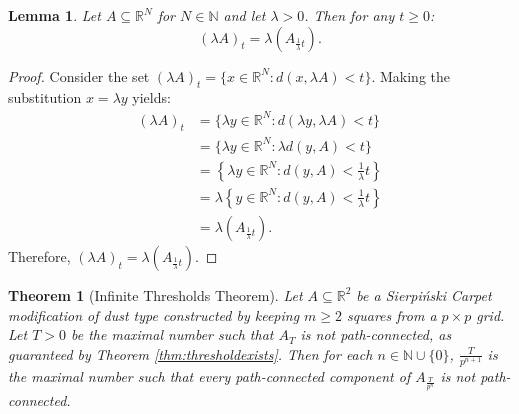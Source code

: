 \documentclass{article}
\theoremstyle{plain}
\newtheorem{theorem}{Theorem}
\newtheorem{lemma}{Lemma}
\numberwithin{equation}{section}
\numberwithin{table}{section}
\numberwithin{figure}{section}
\newcommand{\vaddspace}[1]{\rule{0pt}{#1pt}}
\newcommand{\newparagraph}{\vaddspace{10}}
\begin{document}
\begin{lemma} \label{thm:inflationlemma}
Let $A \subseteq \mathbb{R}^N$ for $N \in \mathbb{N}$ and let $\lambda > 0$. Then for any $t \geq 0$:
\begin{equation}
(\lambda A)_t = \lambda \left(A_{\frac{1}{\lambda} t}\right).
\end{equation}
\end{lemma}
\begin{proof}
Consider the set $(\lambda A)_t = \{x \in \mathbb{R}^N : d(x,\lambda A) < t\}$. Making the substitution $x = \lambda y$ yields:
\begin{align*}
(\lambda A)_t &= \{\lambda y \in \mathbb{R}^N : d(\lambda y, \lambda A) < t\}\\
&= \{\lambda y \in \mathbb{R}^N : \lambda d(y, A) < t\}\\
&= \left\{\lambda y \in \mathbb{R}^N : d(y, A) < \frac{1}{\lambda} t\right\}\\
&= \lambda \left\{y \in \mathbb{R}^N : d(y, A) < \frac{1}{\lambda} t\right\}\\
&= \lambda \left(A_{\frac{1}{\lambda} t}\right).
\end{align*}
Therefore, $\displaystyle (\lambda A)_t = \lambda \left(A_{\frac{1}{\lambda} t}\right)$.
\end{proof}
\newparagraph



\begin{theorem}[Infinite Thresholds Theorem] \label{thm:infinitethresholdsexist}
Let $A \subseteq \mathbb{R}^2$ be a Sierpi\'nski Carpet modification of dust type constructed by keeping $m \geq 2$ squares from a $p \times p$ grid. Let $T > 0$ be the maximal number such that $A_T$ is not path-connected, as guaranteed by Theorem \ref{thm:thresholdexists}. Then for each $n \in \mathbb{N} \cup \{0\}$, $\frac{T}{p^{n+1}}$ is the maximal number such that every path-connected component of $A_{\frac{T}{p^n}}$ is not path-connected.
\end{theorem}
\end{document}
